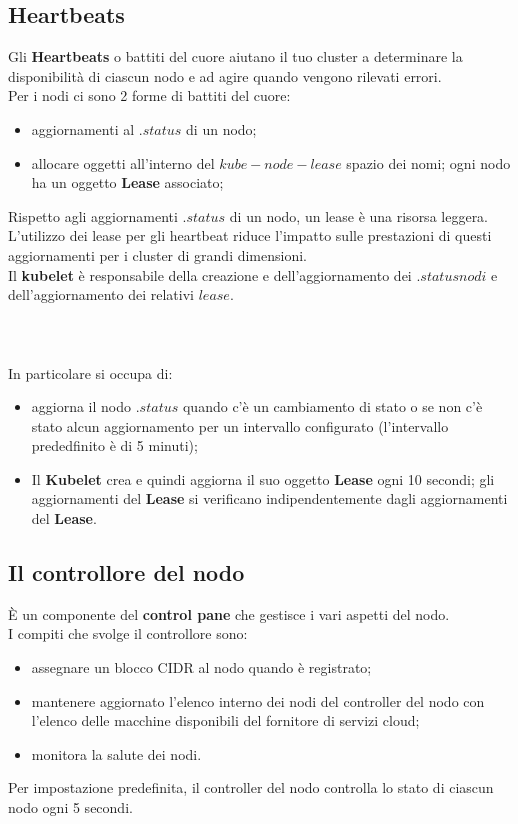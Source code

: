\documentclass{article}
\begin{document}
\subsection{Heartbeats}
Gli \textbf{Heartbeats} o battiti del cuore  aiutano il tuo cluster a determinare la disponibilità di ciascun nodo e ad agire quando vengono rilevati errori.\\
Per i nodi ci sono 2 forme di battiti del cuore: 
\begin{itemize}
    \item aggiornamenti al
    $.status$ di un nodo;
    \item allocare oggetti all'interno del $kube-node-lease$ spazio dei nomi; ogni nodo ha un oggetto \textbf{Lease} associato;
\end{itemize}
Rispetto agli aggiornamenti $.status$ di un nodo, un lease è una risorsa leggera. L'utilizzo dei lease per gli heartbeat riduce l'impatto sulle prestazioni di questi aggiornamenti per i cluster di grandi dimensioni.\\
Il \textbf{kubelet} è responsabile della creazione e dell'aggiornamento dei $.status nodi$ e dell'aggiornamento dei relativi $lease$.\\\\\\\\
In particolare si occupa di: 
\begin{itemize}
    \item  aggiorna il nodo $.status$ quando c'è un cambiamento di stato o se non c'è stato alcun aggiornamento per un intervallo configurato (l'intervallo prededfinito è di 5 minuti);
    \item Il \textbf{Kubelet} crea e quindi aggiorna il suo oggetto \textbf{Lease} ogni 10 secondi; gli aggiornamenti del \textbf{Lease} si verificano indipendentemente dagli aggiornamenti del \textbf{Lease}.
\end{itemize}
\subsection{Il controllore del nodo}
È un componente del \textbf{control pane} che gestisce i vari aspetti del nodo. \\
I compiti che svolge il controllore sono: 
\begin{itemize}
    \item assegnare un blocco CIDR al nodo quando è registrato;
    \item mantenere aggiornato l'elenco interno dei nodi del controller del nodo con l'elenco delle macchine disponibili del fornitore di servizi cloud;
    \item monitora la salute dei nodi.
\end{itemize}
Per impostazione predefinita, il controller del nodo controlla lo stato di ciascun nodo ogni 5 secondi. 
\end{document}
